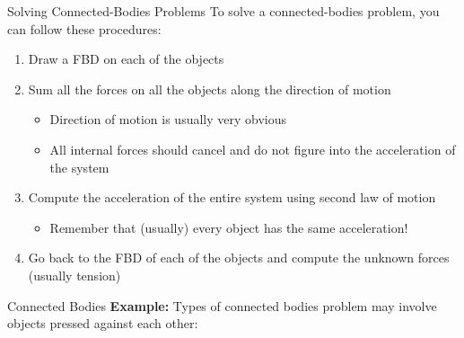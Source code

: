 \documentclass[12pt,compress,aspectratio=169]{beamer}
\begin{document}
\begin{frame}{Solving Connected-Bodies Problems}
  To solve a connected-bodies problem, you can follow these procedures:
  \begin{enumerate}
  \item Draw a FBD on each of the objects
  \item Sum all the forces on all the objects along the direction of motion
    \begin{itemize}
    \item Direction of motion is usually very obvious
    \item All internal forces should cancel and do not figure into the
      acceleration of the system
    \end{itemize}
  \item Compute the acceleration of the entire system using second law of motion
    \begin{itemize}
    \item Remember that (usually) every object has the same acceleration!
    \end{itemize}
  \item Go back to the FBD of each of the objects and compute the unknown
    forces (usually tension)
  \end{enumerate}
\end{frame}






\begin{frame}{Connected Bodies}
  \textbf{Example:} Types of connected bodies problem may involve objects
  pressed against each other:
  \begin{center}
  \end{center}
\end{frame}
\end{document}
